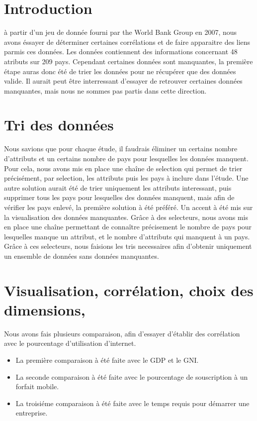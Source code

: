 \section{Introduction}

    à partir d'un jeu de donnée fourni par the World Bank Group en 2007, nous avons éssayer de déterminer certaines corrélations et de faire apparaitre des liens parmis ces données.
    Les données contiennent des informations concernant 48 atributs sur 209 pays.
    Cependant certaines données sont manquantes, la première étape auras donc été de trier les données pour ne récupérer que des données valide.
    Il aurait peut être interressant d'essayer de retrouver certaines données manquantes, mais nous ne sommes pas partis dans cette direction.
    
\section{Tri des données}
    Nous savions que pour chaque étude, il faudrais éliminer un certains nombre d'attributs et un certains nombre de pays pour lesquelles les données manquent.
    Pour cela, nous avons mis en place une chaîne de selection qui permet de trier précisément, par selection, les attributs puis les pays à inclure dans l'étude. Une autre solution aurait été de trier uniquement les attributs interessant, puis supprimer tous les pays pour lesquelles des données manquent, mais afin de vérifier les pays enlevé, la première solution à été préféré.
    Un accent à été mis sur la visualisation des données manquantes. Grâce à des selecteurs, nous avons mis en place une chaîne permettant de connaître précisement le nombre de pays pour lesquelles manque un attribut, et le nombre d'attributs qui manquent à un pays.
    Grâce à ces selecteurs, nous faisions les tris necessaires afin d'obtenir uniquement un ensemble de données sans données manquantes.
        
\section{Visualisation, corrélation, choix des dimensions, }

    Nous avons fais plusieurs comparaison, afin d'essayer d'établir des corrélation avec le pourcentage d'utilisation d'internet.
    \begin{itemize}
        \item La première comparaison à été faite avec le GDP et le GNI.
        \item La seconde comparaison à été faite avec le pourcentage de souscription à un forfait mobile.
        \item La troisiéme comparaison à été faite avec le temps requis pour démarrer une entreprise.
    \end{itemize}

